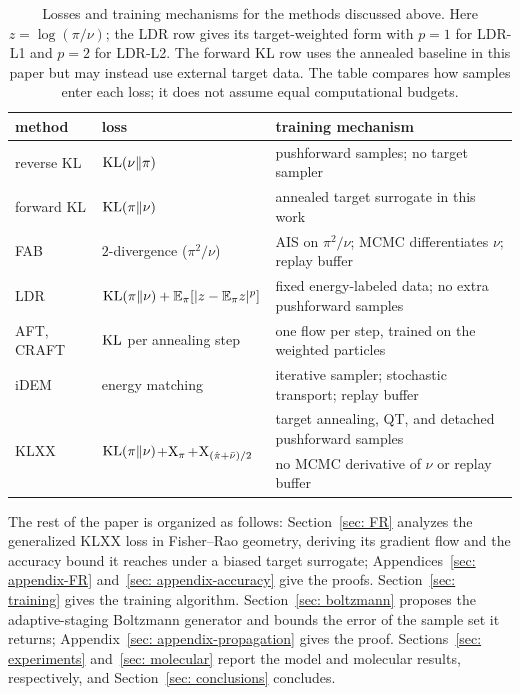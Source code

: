 \documentclass{article}
\begin{document}
\begin{table}[htb]
\centering
{\small
\begin{tabular}{@{}lll@{}}
\toprule
method & loss & training mechanism \\
\midrule
reverse KL & $\mathrm{KL}(\nu\|\pi)$ & pushforward samples; no target sampler \\
forward KL & $\mathrm{KL}(\pi\|\nu)$ & annealed target surrogate in this work \\
FAB & $2$-divergence ($\pi^2/\nu$) & AIS on $\pi^2/\nu$; MCMC differentiates $\nu$; replay buffer \\
LDR & $\mathrm{KL}(\pi\|\nu)+\mathbb E_\pi[|z-\mathbb E_\pi z|^p]$ & fixed energy-labeled data; no extra pushforward samples \\
AFT, CRAFT & $\mathrm{KL}$ per annealing step & one flow per step, trained on the weighted particles \\
iDEM & energy matching & iterative sampler; stochastic transport; replay buffer \\
\multirow{2}{*}{KLXX} &
\multirow{2}{*}{$\mathrm{KL}(\pi\|\nu)$+$\mathrm{X}_\pi$+$\mathrm{X}_{(\hat\pi+\bar\nu)/2}$} &
target annealing, QT, and detached pushforward samples \\
& & no MCMC derivative of $\nu$ or replay buffer \\
\bottomrule
\end{tabular}
}
\caption{Losses and training mechanisms for the methods discussed above. Here $z=\log(\pi/\nu)$; the LDR row gives its target-weighted form with $p=1$ for LDR-L1 and $p=2$ for LDR-L2. The forward KL row uses the annealed baseline in this paper but may instead use external target data. The table compares how samples enter each loss; it does not assume equal computational budgets.}
\label{tab: loss-methods}
\end{table}

The rest of the paper is organized as follows:
{\color{blue}Section~\ref{sec: FR}} analyzes the generalized KLXX loss in Fisher--Rao geometry, deriving its gradient flow and the accuracy bound it reaches under a biased target surrogate; Appendices~\ref{sec: appendix-FR} and~\ref{sec: appendix-accuracy} give the proofs. Section~\ref{sec: training} gives the training algorithm. Section~\ref{sec: boltzmann} proposes the adaptive-staging Boltzmann generator and bounds the error of the sample set it returns; Appendix~\ref{sec: appendix-propagation} gives the proof. Sections~\ref{sec: experiments} and~\ref{sec: molecular} report the model and molecular results, respectively, and Section~\ref{sec: conclusions} concludes.
\end{document}
